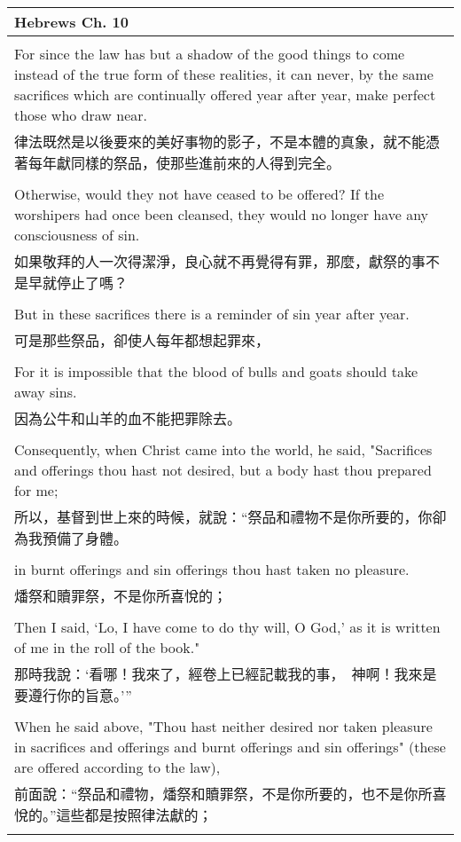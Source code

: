 \documentclass{book}
\begin{document}
\begin{tabularx}{\textwidth}{p{}}
\hline
Hebrews Ch. 10 \\
\hline \\
For since the law has but a shadow of the good things to come instead of the true form of these realities, it can never, by the same sacrifices which are continually offered year after year, make perfect those who draw near. \\
律法既然是以後要來的美好事物的影子，不是本體的真象，就不能憑著每年獻同樣的祭品，使那些進前來的人得到完全。 \\ \\
Otherwise, would they not have ceased to be offered? If the worshipers had once been cleansed, they would no longer have any consciousness of sin. \\
如果敬拜的人一次得潔淨，良心就不再覺得有罪，那麼，獻祭的事不是早就停止了嗎？ \\ \\
But in these sacrifices there is a reminder of sin year after year. \\
可是那些祭品，卻使人每年都想起罪來， \\ \\
For it is impossible that the blood of bulls and goats should take away sins. \\
因為公牛和山羊的血不能把罪除去。 \\ \\
Consequently, when Christ came into the world, he said,  "Sacrifices and offerings thou hast not desired, but a body hast thou prepared for me; \\
所以，基督到世上來的時候，就說：“祭品和禮物不是你所要的，你卻為我預備了身體。 \\ \\
in burnt offerings and sin offerings thou hast taken no pleasure. \\
燔祭和贖罪祭，不是你所喜悅的； \\ \\
Then I said, `Lo, I have come to do thy will, O God,' as it is written of me in the roll of the book." \\
那時我說：‘看哪！我來了，經卷上已經記載我的事，　神啊！我來是要遵行你的旨意。’” \\ \\
When he said above, "Thou hast neither desired nor taken pleasure in sacrifices and offerings and burnt offerings and sin offerings" (these are offered according to the law), \\
前面說：“祭品和禮物，燔祭和贖罪祭，不是你所要的，也不是你所喜悅的。”這些都是按照律法獻的； \\ \\

\end{tabularx}
\end{document}
